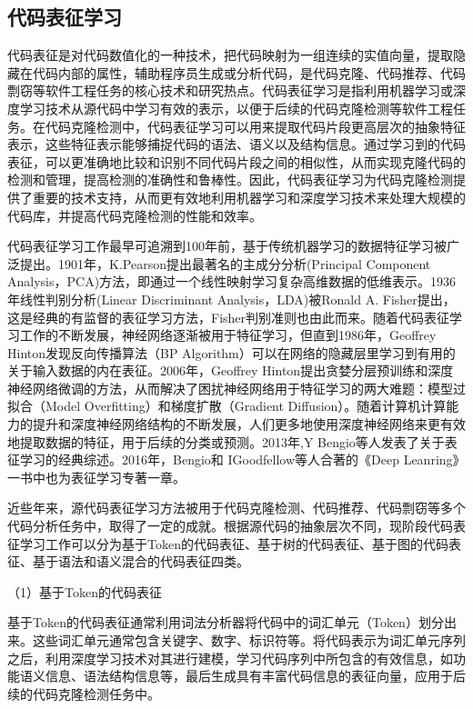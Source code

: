 \subsection{代码表征学习}

代码表征是对代码数值化的一种技术，把代码映射为一组连续的实值向量，提取隐藏在代码内部的属性，辅助程序员生成或分析代码，是代码克隆、代码推荐、代码剽窃等软件工程任务的核心技术和研究热点\cite{谢春丽_53}。代码表征学习是指利用机器学习或深度学习技术从源代码中学习有效的表示，以便于后续的代码克隆检测等软件工程任务。在代码克隆检测中，代码表征学习可以用来提取代码片段更高层次的抽象特征表示，这些特征表示能够捕捉代码的语法、语义以及结构信息。通过学习到的代码表征，可以更准确地比较和识别不同代码片段之间的相似性，从而实现克隆代码的检测和管理，提高检测的准确性和鲁棒性。因此，代码表征学习为代码克隆检测提供了重要的技术支持，从而更有效地利用机器学习和深度学习技术来处理大规模的代码库，并提高代码克隆检测的性能和效率。

代码表征学习工作最早可追溯到100年前，基于传统机器学习的数据特征学习被广泛提出。1901年，K.Pearson提出最著名的主成分分析(Principal Component Analysis，PCA)方法\cite{WOS:000202849800065}，即通过一个线性映射学习复杂高维数据的低维表示。1936年线性判别分析(Linear Discriminant Analysis，LDA)被Ronald A. Fisher提出\cite{2012THE}，这是经典的有监督的表征学习方法，Fisher判别准则也由此而来。随着代码表征学习工作的不断发展，神经网络逐渐被用于特征学习，但直到1986年，Geoffrey Hinton\cite{1986Learning}发现反向传播算法（BP Algorithm）可以在网络的隐藏层里学习到有用的关于输入数据的内在表征。2006年，Geoffrey Hinton提出贪婪分层预训练和深度神经网络微调\cite{2006A}的方法，从而解决了困扰神经网络用于特征学习的两大难题：模型过拟合（Model Overfitting）和梯度扩散（Gradient Diffusion）。随着计算机计算能力的提升和深度神经网络结构的不断发展，人们更多地使用深度神经网络来更有效地提取数据的特征，用于后续的分类或预测。2013年,Y Bengio等人发表了关于表征学习的经典综述\cite{Bengio2013Representation}。2016年，Bengio和 IGoodfellow等人合著的《Deep Leanring》一书中也为表征学习专著一章\cite{goodfellow2016deep}。

近些年来，源代码表征学习方法被用于代码克隆检测、代码推荐、代码剽窃等多个代码分析任务中，取得了一定的成就。根据源代码的抽象层次不同，现阶段代码表征学习工作可以分为基于Token的代码表征、基于树的代码表征、基于图的代码表征、基于语法和语义混合的代码表征四类。

（1）基于Token的代码表征

基于Token的代码表征通常利用词法分析器将代码中的词汇单元（Token）划分出来。这些词汇单元通常包含关键字、数字、标识符等。将代码表示为词汇单元序列之后，利用深度学习技术对其进行建模，学习代码序列中所包含的有效信息，如功能语义信息、语法结构信息等，最后生成具有丰富代码信息的表征向量，应用于后续的代码克隆检测任务中。

